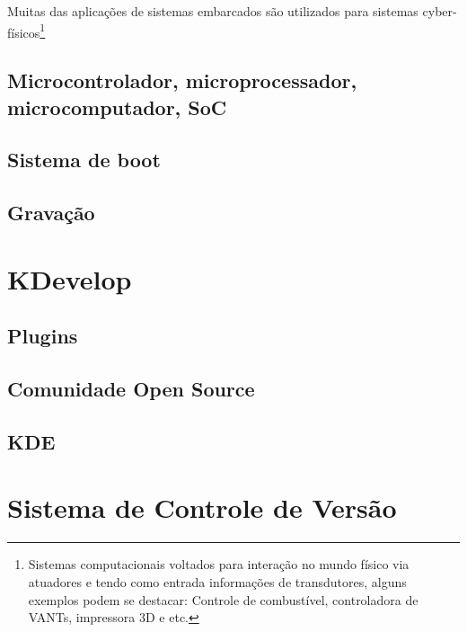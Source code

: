 Muitas das aplicações de sistemas embarcados são utilizados para sistemas cyber-físicos\footnote{Sistemas computacionais voltados para interação no mundo físico via atuadores e tendo como entrada informações de transdutores, alguns exemplos podem se destacar: Controle de combustível, controladora de VANTs, impressora 3D e etc.}

\subsection{Microcontrolador, microprocessador, microcomputador, SoC}
\lipsum[1-4]

\subsection{Sistema de boot}
\lipsum[1-4]

\subsection{Gravação}
\lipsum[1-4]

\section{KDevelop}
\lipsum[1-4]

\subsection{Plugins}
\lipsum[1-4]

\subsection{Comunidade Open Source}
\lipsum[1-4]

\subsection{KDE}
\lipsum[1-4]

\section{Sistema de Controle de Versão}
\lipsum[1-4]
